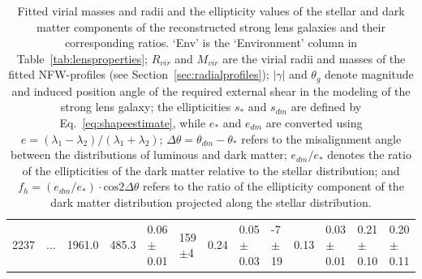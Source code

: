 \documentclass[useAMS,usenatbib]{mn2e}
\begin{document}
\begin{table}
\begin{center}
\begin{tabular}{l l l l l l l l l l l l l}
      2237 & ... & 1961.0 & 485.3 & 0.06$\pm$0.01 & 159$\pm$4 & 0.24 & 0.05$\pm$0.03 & -7$\pm$19 & 0.13 & 0.03$\pm$0.01 & 0.21$\pm$0.10 & 0.20$\pm$0.11 \\
    \end{tabular}
    \caption{Fitted virial masses and radii and the ellipticity values of the stellar and dark matter components of the reconstructed strong lens galaxies and their corresponding ratios. `Env' is the `Environment' column in Table~\ref{tab:lensproperties}; $R_{vir}$ and $M_{vir}$ are the virial radii and masses of the fitted NFW-profiles (see Section~\ref{sec:radialprofiles}); $|\gamma|$ and $\theta_{g}$ denote magnitude and induced position angle of the required external shear in the modeling of the strong lens galaxy; the ellipticities $s_{*}$ and $s_{dm}$ are defined by Eq.~\ref{eq:shapeestimate}, while $e_{*}$ and $e_{dm}$ are converted using $e = (\lambda_1-\lambda_2)/(\lambda_1+\lambda_2)$; $\Delta\theta=\theta_{dm}-\theta_{*}$ refers to the misalignment angle between the distributions of luminous and dark matter; $e_{dm}/e_{*}$ denotes the ratio of the ellipticities of the dark matter relative to the stellar distribution; and $f_h=(e_{dm}/e_{*})\cdot\mathrm{cos} 2\Delta\theta$ refers to the ratio of the ellipticity component of the dark matter distribution projected along the stellar distribution.}
    \label{tab:ellipratios}
  \end{center}
\end{table}
\setlength\tabcolsep{6pt}

\end{document}
